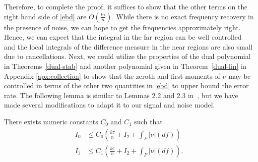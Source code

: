 Therefore, to complete the proof, it suffices to show that the other terms on
the right hand side of \eqref{ebd} are $O(\frac{k\tau}{n})$. While there is no
exact frequency recovery in the presence of noise, we can hope to get the
frequencies approximately right. Hence, we can expect that the integral in the
far region can be well controlled and the local integrals of the difference
measure in the near regions are also small due to cancellations. Next, we could
utilize the properties of the dual polynomial in Theorems~\ref{dual-stab} and
another polynomial given in Theorem~\ref{dual-lin} in Appendix
\ref{apx:collection} to show that the zeroth and first moments of $\nu$ may be
controlled in terms of the other two quantities in \eqref{ebd} to upper bound
the error rate. The following lemma is similar to Lemmas 2.2 and 2.3
in~\cite{cg_noisy}, but we have made several modifications to adapt it to our
signal and noise model. \begin{lemma} \label{part2} There exists numeric
constants $C_0$ and $C_1$ such that \begin{align*} I_0 &\leq C_0 \left(\frac{k
\tau}{n} + I_2 + \int_F{|\nu|(df)}\right) \\ I_1 &\leq C_1 \left(\frac{k
\tau}{n} + I_2 + \int_F{|\nu|(df)}\right). \end{align*} \end{lemma}

